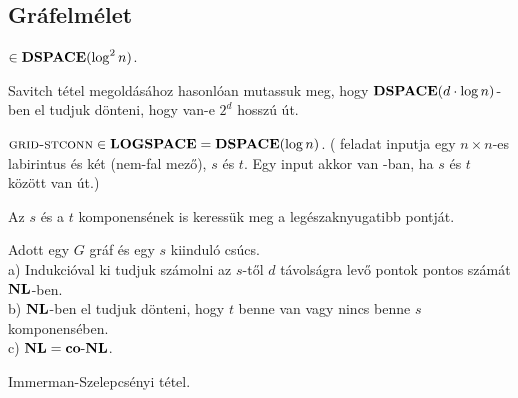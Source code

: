 \subsection{Gr\'afelm\'elet}

\begin{Exercise}[counter={sorszam}, difficulty=0]
	$\in \mbox{\ensuremath{\mathbf{DSPACE}}}(\log^2 n)$.
\end{Exercise}	
\begin{Answer}
	Savitch t\'etel megold\'as\'ahoz hasonl\'oan mutassuk meg, hogy $\mbox{\ensuremath{\mathbf{DSPACE}}}(d\cdot \log n)$-ben el tudjuk d\"onteni, hogy van-e $2^d$ hossz\'u \'ut.
\end{Answer}


%	

\begin{Exercise}[counter={sorszam}, difficulty=0]
	$\la{Grid-STconn} \in \LOGSPACE=\DSPACE(\log n)$.
	( feladat inputja egy $n\times n$-es labirintus \'es k\'et (nem-fal mez\H o), $s$ \'es $t$.
	Egy input akkor van -ban, ha $s$ \'es $t$ k\"oz\"ott van \'ut.)
\end{Exercise}	
\begin{Answer}
	Az $s$ \'es a $t$ komponens\'enek is keress\"uk meg a leg\'eszaknyugatibb pontj\'at.
\end{Answer}

\begin{Exercise}[counter={sorszam}, difficulty=0]
	Adott egy $G$ gr\'af \'es egy $s$ kiindul\'o cs\'ucs.\\
	a) Indukci\'oval ki tudjuk sz\'amolni az $s$-t\H ol $d$ t\'avols\'agra lev\H o pontok pontos sz\'am\'at $\mbox{\ensuremath{\mathbf{NL}}}$-ben.\\
	b) $\mbox{\ensuremath{\mathbf{NL}}}$-ben el tudjuk d\"onteni, hogy $t$ benne van vagy nincs benne $s$ komponens\'eben.\\
	c) $\mbox{\ensuremath{\mathbf{NL}}}=\mbox{\ensuremath{\mathbf{co\text{-}NL}}}$.
\end{Exercise}	
\begin{Answer}
	Immerman-Szelepcsényi t\'etel.
\end{Answer} 

